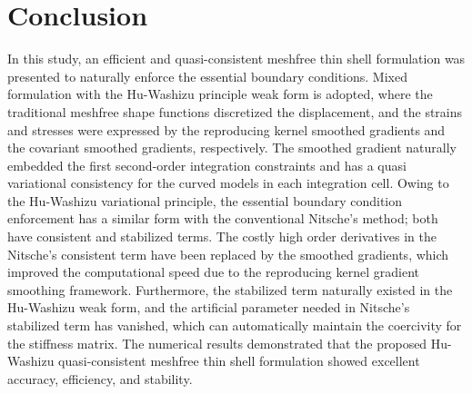 \section{Conclusion}\label{conclusion}
In this study, an efficient and quasi-consistent meshfree thin shell formulation was presented to naturally enforce the essential boundary conditions.  Mixed formulation with the Hu-Washizu principle weak form is adopted, where the traditional meshfree shape functions discretized the displacement, and the strains and stresses were expressed by the reproducing kernel smoothed gradients and the covariant smoothed gradients, respectively. The smoothed gradient naturally embedded the first second-order integration constraints and has a quasi variational consistency for the curved models in each integration cell. Owing to the Hu-Washizu variational principle, the essential boundary condition enforcement has a similar form with the conventional Nitsche’s method; both have consistent and stabilized terms. The costly high order derivatives in the Nitsche’s consistent term have been replaced by the smoothed gradients, which improved the computational speed due to the reproducing kernel gradient smoothing framework. Furthermore, the stabilized term naturally existed in the Hu-Washizu weak form, and the artificial parameter needed in Nitsche’s stabilized term has vanished, which can automatically maintain the coercivity for the stiffness matrix. The numerical results demonstrated that the proposed Hu-Washizu quasi-consistent meshfree thin shell formulation showed excellent accuracy, efficiency, and stability.


